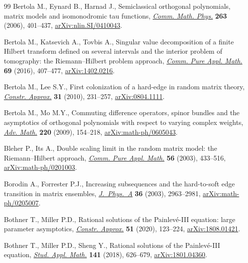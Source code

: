 \documentclass[pdftex]{sigma}
\numberwithin{equation}{section}
\theoremstyle{definition}
\begin{document}
\begin{thebibliography}{99}
Bertola M., Eynard B., Harnad J., Semiclassical orthogonal polynomials, matrix
 models and isomonodromic tau functions,
 \href{https://doi.org/10.1007/s00220-005-1505-4}{\textit{Comm. Math. Phys.}}
 \textbf{263} (2006), 401--437,
 \href{http://arxiv.org/abs/nlin.SI/0410043}{arXiv:nlin.SI/0410043}.

Bertola M., Katsevich A., Tovbis A., Singular value decomposition of a finite
 {H}ilbert transform defined on several intervals and the interior problem of
 tomography: the {R}iemann--{H}ilbert problem approach,
 \href{https://doi.org/10.1002/cpa.21547}{\textit{Comm. Pure Appl. Math.}}
 \textbf{69} (2016), 407--477,
 \href{http://arxiv.org/abs/1402.0216}{arXiv:1402.0216}.

Bertola M., Lee S.Y., First colonization of a hard-edge in random matrix
 theory, \href{https://doi.org/10.1007/s00365-009-9052-4}{\textit{Constr.
 Approx.}} \textbf{31} (2010), 231--257,
 \href{http://arxiv.org/abs/0804.1111}{arXiv:0804.1111}.

Bertola M., Mo M.Y., Commuting difference operators, spinor bundles and the
 asymptotics of orthogonal polynomials with respect to varying complex
 weights, \href{https://doi.org/10.1016/j.aim.2008.09.001}{\textit{Adv.
 Math.}} \textbf{220} (2009), 154--218,
 \href{http://arxiv.org/abs/math-ph/0605043}{arXiv:math-ph/0605043}.

Bleher P., Its A., Double scaling limit in the random matrix model: the
 {R}iemann--{H}ilbert approach,
 \href{https://doi.org/10.1002/cpa.10065}{\textit{Comm. Pure Appl. Math.}}
 \textbf{56} (2003), 433--516,
 \href{http://arxiv.org/abs/math-ph/0201003}{arXiv:math-ph/0201003}.

Borodin A., Forrester P.J., Increasing subsequences and the hard-to-soft edge
 transition in matrix ensembles,
 \href{https://doi.org/10.1088/0305-4470/36/12/307}{\textit{J.~Phys.~A}}
 \textbf{36} (2003), 2963--2981,
 \href{http://arxiv.org/abs/math-ph/0205007}{arXiv:math-ph/0205007}.

Bothner T., Miller P.D., Rational solutions of the {P}ainlev\'e-{III} equation:
 large parameter asymptotics,
 \href{https://doi.org/10.1007/s00365-019-09463-4}{\textit{Constr. Approx.}}
 \textbf{51} (2020), 123--224,
 \href{http://arxiv.org/abs/1808.01421}{arXiv:1808.01421}.

Bothner T., Miller P.D., Sheng Y., Rational solutions of the {P}ainlev\'e-{III}
 equation, \href{https://doi.org/10.1111/sapm.12220}{\textit{Stud. Appl.
 Math.}} \textbf{141} (2018), 626--679,
 \href{http://arxiv.org/abs/1801.04360}{arXiv:1801.04360}.


\end{thebibliography}
\end{document}
